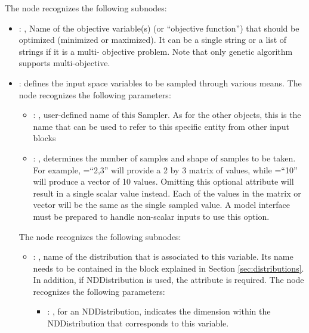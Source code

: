   The  node recognizes the following subnodes:
  \begin{itemize}
    \item {}: ,
      Name of the objective variable(s) (or ``objective function'') that should be optimized
      (minimized or maximized). It can be a single string or a list of strings if it is a multi-
      objective problem.         Note that only genetic algorithm supports multi-objective.

    \item {}:
      defines the input space variables to be sampled through various means.
      The  node recognizes the following parameters:
        \begin{itemize}
          \item {}: ,
            user-defined name of this Sampler. \nb As for the other objects,               this is
            the name that can be used to refer to this specific entity from other input blocks
          \item {}: ,
            determines the number of samples and shape of samples               to be taken.  For
            example, =``2,3'' will provide a 2 by 3               matrix of values,
            while =``10'' will produce a vector of 10 values.               Omitting
            this optional attribute will result in a single scalar value instead.               Each
            of the values in the matrix or vector will be the same as the single sampled value.
            \nb A model interface must be prepared to handle non-scalar inputs to use this option.
      \end{itemize}

      The  node recognizes the following subnodes:
      \begin{itemize}
        \item {}: ,
          name of the distribution that is associated to this variable.               Its name needs
          to be contained in the  block explained               in Section
          \ref{sec:distributions}. In addition, if NDDistribution is used,               the
          attribute  is required. 
          The  node recognizes the following parameters:
            \begin{itemize}
              \item {}: ,
                for an NDDistribution, indicates the dimension within the NDDistribution that
                corresponds               to this variable.
          \end{itemize}


\end{itemize}
\end{itemize}
